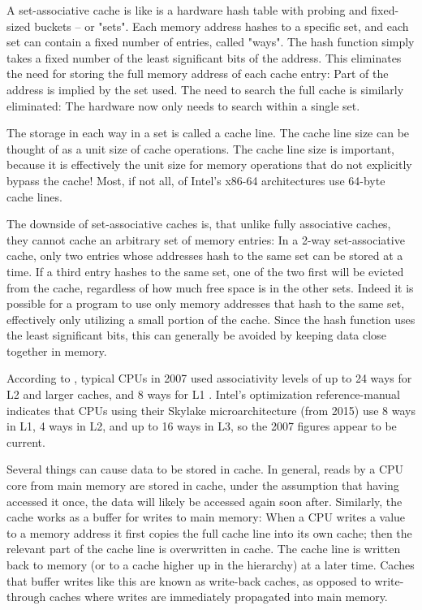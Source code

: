 A set-associative cache is like is a hardware hash table with probing and
fixed-sized buckets -- or "sets". Each memory address hashes to a specific set,
and each set can contain a fixed number of entries, called "ways". The hash
function simply takes a fixed number of the least significant bits of the
address. This eliminates the need for storing the full memory address of each
cache entry: Part of the address is implied by the set used. The need to search
the full cache is similarly eliminated: The hardware now only needs to search
within a single set.

The storage in each way in a set is called a cache line. The cache line
size can be thought of as a unit size of cache operations. The cache line size
is important, because it is effectively the unit size for memory operations that
do not explicitly bypass the cache! Most, if not all, of
Intel's x86-64 architectures use 64-byte cache lines\cite{inteloptimize}.

The downside of set-associative caches is, that unlike fully associative
caches, they cannot cache an arbitrary set of memory entries: In a 2-way
set-associative cache, only two entries whose addresses hash to the same set can
be stored at a time. If a third entry hashes to the same set, one of the two
first will be evicted from the cache, regardless of how much free space is in
the other sets. Indeed it is possible for a program to use only memory
addresses that hash to the same set, effectively only utilizing a small portion
of the cache. Since the hash function uses the least significant bits, this can
generally be avoided by keeping data close together in memory.

According to \citeauthor{whatprogrammersshouldknow}, typical
CPUs in 2007 used associativity levels of up to 24 ways for L2 and larger
caches, and 8 ways for L1 \cite{whatprogrammersshouldknow}. Intel's
optimization reference-manual \cite{inteloptimize} indicates that CPUs using their
Skylake microarchitecture (from 2015) use 8 ways in L1, 4 ways in L2, and up to
16 ways in L3, so the 2007 figures appear to be current.

Several things can cause data to be stored in cache. In general, reads by
a CPU core from main memory are stored in cache, under the
assumption that having accessed it once, the data will likely be accessed again
soon after. Similarly, the cache works as a buffer for writes to main memory:
When a CPU writes a value to a memory address it first copies the full
cache line into its own cache; then the relevant part of the cache line is
overwritten in cache. The cache line is written back to memory (or to a
cache higher up in the hierarchy) at a later time. Caches that buffer writes
like this are known as write-back caches, as opposed to write-through caches
where writes are immediately propagated into main memory.


